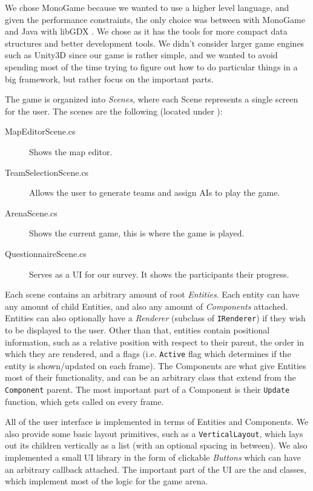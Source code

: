We chose MonoGame because we wanted to use a higher level language, and given the performance constraints, the only choice was between \Csh with MonoGame and Java with libGDX \citep{libgdx}. We chose \Csh as it has the tools for more compact data structures and better development tools. We didn't consider larger game engines such as Unity3D \citep{unity3d} since our game is rather simple, and we wanted to avoid spending most of the time trying to figure out how to do particular things in a big framework, but rather focus on the important parts.

The game is organized into \emph{Scenes}, where each Scene represents a single screen for the user. The scenes are the following (located under ):

\begin{description}
	\item[MapEditorScene.cs] Shows the map editor.
	\item[TeamSelectionScene.cs] Allows the user to generate teams and assign AIs to play the game.
	\item[ArenaScene.cs] Shows the current game, this is where the game is played.
	\item[QuestionnaireScene.cs] Serves as a UI for our survey. It shows the participants their progress.
\end{description}

Each scene contains an arbitrary amount of root \emph{Entities}. Each entity can have any amount of child Entities, and also any amount of \emph{Components} attached. Entities can also optionally have a \emph{Renderer} (subclass of \verb|IRenderer|) if they wish to be displayed to the user. Other than that, entities contain positional information, such as a relative position with respect to their parent, the order in which they are rendered, and a flags (i.e. \verb|Active| flag which determines if the entity is shown/updated on each frame). The Components are what give Entities most of their functionality, and can be an arbitrary class that extend from the \verb|Component| parent. The most important part of a Component is their \verb|Update| function, which gets called on every frame.

All of the user interface is implemented in terms of Entities and Components. We also provide some basic layout primitives, such as a \verb|VerticalLayout|, which lays out its children vertically as a list (with an optional spacing in between). We also implemented a small UI library in the form of clickable \emph{Buttons} which can have an arbitrary callback attached. The important part of the UI are the  and  classes, which implement most of the logic for the game arena.

